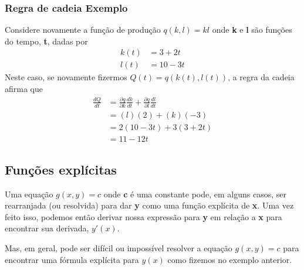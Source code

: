 \documentclass[a4paper]{article}
\begin{document}
\subsubsection*{Regra de cadeia Exemplo}
Considere novamente a função de produção $q(k,l) = kl$ onde \textbf{k} e \textbf{l} são funções do tempo, \textbf{t}, dadas por
\begin{equation}
    \begin{split}        
        k(t) & = 3 + 2t \\
        l(t) & = 10 - 3t
    \end{split}
\end{equation}
Neste caso, se novamente fizermos $Q(t) = q(k(t),l(t))$, a regra da cadeia afirma que
\begin{equation}
    \begin{split}        
        \frac{dQ}{dt} & = \frac{\partial q}{\partial k}\frac{dk}{dt} + \frac{\partial q}{\partial l}\frac{dl}{dt} \\
        & = (l)(2) + (k)(-3) \\
        & = 2(10 - 3t) + 3(3 + 2t) \\
        & = 11 - 12t
    \end{split}
\end{equation}
\subsection{Funções explícitas}
Uma equação $g(x,y)=c$ onde \textbf{c} é uma constante pode, em alguns casos, ser rearranjada (ou resolvida) para dar \textbf{y} como uma função explícita de \textbf{x}. Uma vez feito isso, podemos então derivar nossa expressão para \textbf{y} em relação a \textbf{x} para encontrar sua derivada, $y'(x)$.
\par Mas, em geral, pode ser difícil ou impossível resolver a equação $g(x,y) = c$ para encontrar uma fórmula explícita para $y(x)$ como fizemos no exemplo anterior.
\end{document}
